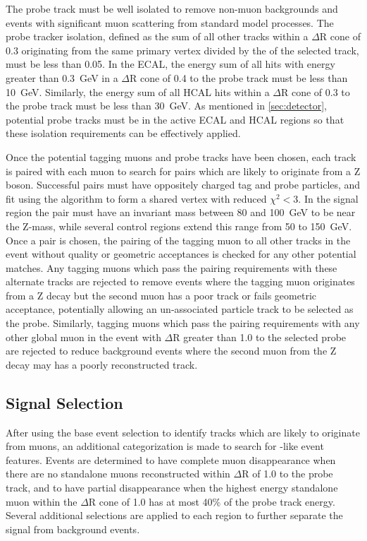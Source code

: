 The probe track must be well isolated to remove non-muon backgrounds and events with significant muon scattering from standard model processes. 
The probe tracker isolation, defined as the \pt sum of all other tracks within a $\Delta$R cone of 0.3 originating from the same primary vertex divided by the \pt of the selected track, must be less than 0.05.
In the ECAL, the energy sum of all hits with energy greater than \SI{0.3}{\giga\eV} in a $\Delta$R cone of 0.4 to the probe track must be less than \SI{10}{\giga\eV}.
Similarly, the energy sum of all HCAL hits within a $\Delta$R cone of 0.3 to the probe track must be less than \SI{30}{\giga\eV}. 
As mentioned in \cref{sec:detector}, potential probe tracks must be in the active ECAL and HCAL regions so that these isolation requirements can be effectively applied.

Once the potential tagging muons and probe tracks have been chosen, each track is paired with each muon to search for pairs which are likely to originate from a Z boson.
Successful pairs must have oppositely charged tag and probe particles, and fit using the \kf algorithm to form a shared vertex with reduced $\chi^2<$3.
In the signal region the pair must have an invariant mass between 80 and \SI{100}{\giga\eV} to be near the Z-mass, while several control regions extend this range from 50 to \SI{150}{\giga\eV}.
Once a pair is chosen, the pairing of the tagging muon to all other tracks in the event without quality or geometric acceptances is checked for any other potential matches.
Any tagging muons which pass the pairing requirements with these alternate tracks are rejected to remove events where the tagging muon originates from a Z decay but the second muon has a poor track or fails geometric acceptance, potentially allowing an un-associated particle track to be selected as the probe.
Similarly, tagging muons which pass the pairing requirements with any other global muon in the event with $\Delta$R greater than 1.0 to the selected probe are rejected to reduce background events where the second muon from the Z decay may has a poorly reconstructed track.


\subsection{Signal Selection}
After using the base event selection to identify tracks which are likely to originate from muons, an additional categorization is made to search for \dbrem-like event features. 
Events are determined to have complete muon disappearance when there are no standalone muons reconstructed within $\Delta$R of 1.0 to the probe track, and to have partial disappearance when the highest energy standalone muon within the $\Delta$R cone of 1.0 has at most 40$\%$ of the probe track energy.
Several additional selections are applied to each region to further separate the signal from background events.


